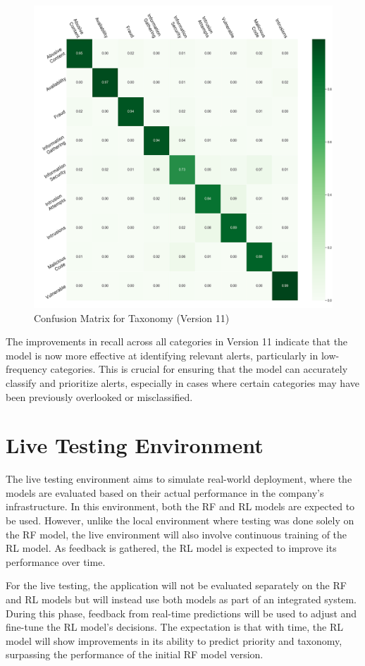 \begin{figure}[h!]
    \centering
    \includegraphics[width=\textwidth]{ch4/assets/v11_confusion_taxonomy.png}
    \caption{Confusion Matrix for Taxonomy (Version 11)}
    \label{fig:confusion_taxonomy_v11}
\end{figure}

The improvements in recall across all categories in Version 11 indicate that the model is now more effective at identifying relevant alerts, particularly in low-frequency categories.
This is crucial for ensuring that the model can accurately classify and prioritize alerts, especially in cases where certain categories may have been previously overlooked or misclassified.

\section{Live Testing Environment}

The live testing environment aims to simulate real-world deployment, where the models are evaluated based on their actual performance in the company's infrastructure. 
In this environment, both the RF and RL models are expected to be used. 
However, unlike the local environment where testing was done solely on the RF model, the live environment will also involve continuous training of the RL model. 
As feedback is gathered, the RL model is expected to improve its performance over time.

For the live testing, the application will not be evaluated separately on the RF and RL models but will instead use both models as part of an integrated system. 
During this phase, feedback from real-time predictions will be used to adjust and fine-tune the RL model's decisions. 
The expectation is that with time, the RL model will show improvements in its ability to predict priority and taxonomy, surpassing the performance of the initial RF model version.
